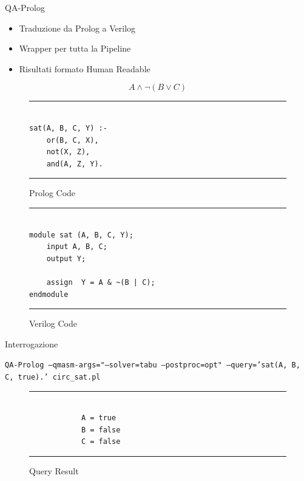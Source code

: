 \begin{frame}[fragile]{QA-Prolog}
	\begin{minipage}{.42\linewidth}
		\begin{block}{}
			\begin{itemize}
				\item Traduzione da Prolog a Verilog
				\item Wrapper per tutta la Pipeline
				\item Risultati formato Human Readable
			\end{itemize}
		\end{block}
		\vspace{.3cm}
		\pause
		\[
		A \land \neg(B \lor C)
		\]
		\pause
		\begin{figure}[h]
			\begin{minipage}{.6\linewidth}
				\hrule
				\begin{verbatim}

sat(A, B, C, Y) :-
	or(B, C, X),
	not(X, Z),
	and(A, Z, Y).
				\end{verbatim}
				\hrule
			\end{minipage}
			\caption{Prolog Code}
		\end{figure}
	\end{minipage}
	\hfill
	\pause
	\begin{minipage}{.52\linewidth}
		\begin{figure}[h]
			\begin{minipage}{.9\linewidth}
				\hrule
				\begin{verbatim}
					
module sat (A, B, C, Y);
	input A, B, C;
	output Y;
	
	assign  Y = A & ~(B | C);
endmodule
				\end{verbatim}
				\hrule
			\end{minipage}
			\caption{Verilog Code}
		\end{figure}
		\pause
		\vspace{-.5cm}
		\begin{block}{Interrogazione}
			\begin{center}
				\scriptsize \texttt{QA-Prolog  --qmasm-args="--solver=tabu --postproc=opt" --query='sat(A, B, C, true).'  circ\_sat.pl}
			\end{center}
		\end{block}
		\begin{figure}
			\begin{minipage}{.4\linewidth}
				\hrule
				\begin{verbatim}
					
			A = true
			B = false
			C = false
				\end{verbatim}
				\hrule
			\end{minipage}
			\caption{Query Result}
		\end{figure}
	\end{minipage}
\end{frame}

